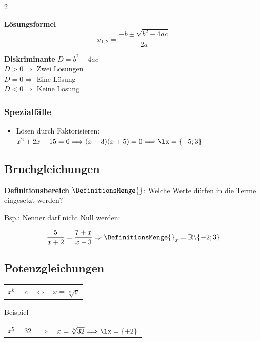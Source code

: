 \begin{multicols}{2}
\begin{tcolorbox}[colback=white]
  \textbf{Lösungsformel}
  $$x_{1,2} = \frac{-b \pm \sqrt{b^2-4ac}}{2a}$$
\end{tcolorbox}
\textbf{Diskriminante} $D = b^2-4ac$\\
$D>0\Longrightarrow$ Zwei Lösungen\\
$D=0\Longrightarrow$ Eine Lösung\\
$D<0\Longrightarrow$ Keine Lösung

\subsubsection*{Spezialfälle}
\begin{itemize}
\item Lösen durch Faktorisieren:\\
$x^2+2x-15=0 \Longrightarrow (x-3)(x+5)=0 \Longrightarrow \lx=\{-5; 3\}$ %
\end{itemize}

\subsection*{Bruchgleichungen}

\textbf{Definitionsbereich} $\DefinitionsMenge{}$: Welche Werte dürfen in die Terme eingesetzt werden?

Bsp.: Nenner darf nicht Null werden:

$$\frac5{x+2}=\frac{7+x}{x-3} \Rightarrow{} \DefinitionsMenge{}_x=\mathbb{R}\backslash{}\{-2; 3\}$$

\subsection*{Potenzgleichungen}


\begin{tabular}{lcl}
$x^k=c$ & $\Leftrightarrow$ & $x=\sqrt[k]{c}$\\
\end{tabular}

Beispiel

\begin{tabular}{rcl}
$x^5=32$ & $\Longrightarrow$ & $x=\sqrt[5]{32} \Longrightarrow \lx=\{+2\}  $ \\


\end{tabular}
\end{multicols}
